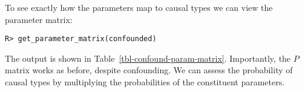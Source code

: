 \documentclass[
  11pt,
  article]{jss}
\begin{document}
To see exactly how the parameters map to causal types we can view the
parameter matrix:

\begin{verbatim}
R> get_parameter_matrix(confounded)
\end{verbatim}

\hypertarget{tbl-confound-param-matrix}{}
\begin{table}
\caption{\label{tbl-confound-param-matrix}Parameter Matrix for Model with Confounding. }\tabularnewline

\centering
{}
\end{table}

The output is shown in Table~\ref{tbl-confound-param-matrix}.
Importantly, the \(P\) matrix works as before, despite confounding. We
can assess the probability of causal types by multiplying the
probabilities of the constituent parameters.
\end{document}
